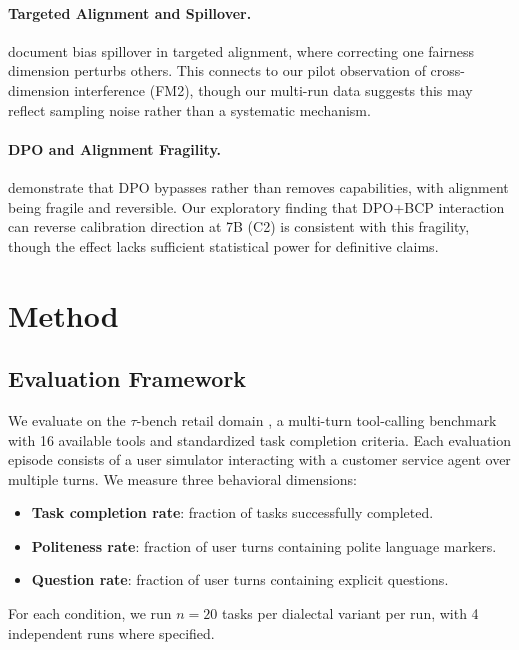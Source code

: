 \documentclass[11pt]{article}
\begin{document}
\paragraph{Targeted Alignment and Spillover.}
\citet{gupta2026intra_fairness} document bias spillover in targeted alignment, where correcting one fairness dimension perturbs others.
This connects to our pilot observation of cross-dimension interference (FM2), though our multi-run data suggests this may reflect sampling noise rather than a systematic mechanism.

\paragraph{DPO and Alignment Fragility.}
\citet{lee2024dpo_toxicity} demonstrate that DPO bypasses rather than removes capabilities, with alignment being fragile and reversible.
Our exploratory finding that DPO+BCP interaction can reverse calibration direction at 7B (C2) is consistent with this fragility, though the effect lacks sufficient statistical power for definitive claims.

\section{Method}
\label{sec:method}

\subsection{Evaluation Framework}

We evaluate on the $\tau$-bench retail domain \citep{yao2024taubench}, a multi-turn tool-calling benchmark with 16 available tools and standardized task completion criteria.
Each evaluation episode consists of a user simulator interacting with a customer service agent over multiple turns.
We measure three behavioral dimensions:
\begin{itemize}
    \item \textbf{Task completion rate}: fraction of tasks successfully completed.
    \item \textbf{Politeness rate}: fraction of user turns containing polite language markers.
    \item \textbf{Question rate}: fraction of user turns containing explicit questions.
\end{itemize}

For each condition, we run $n=20$ tasks per dialectal variant per run, with 4 independent runs where specified.
\end{document}
